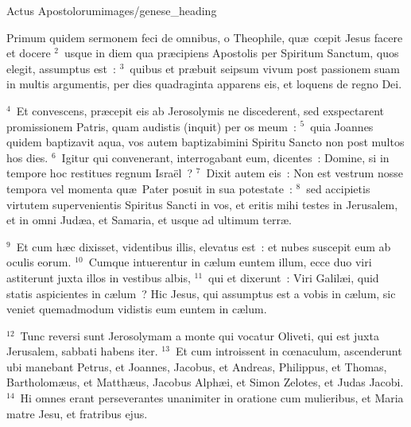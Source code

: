 {Actus Apostolorum}{images/genese_heading}


\lettrine[lines=6,image=true,loversize=0.05,lraise=-0.03]{P}{}rimum quidem sermonem feci de omnibus, o Theophile, qu\ae\ cœpit Jesus facere et docere
${}^{2}$~usque in diem qua pr\ae cipiens Apostolis per Spiritum Sanctum, quos elegit, assumptus est~:
${}^{3}$~quibus et pr\ae buit seipsum vivum post passionem suam in multis argumentis, per dies quadraginta apparens eis, et loquens de regno Dei.


${}^{4}$~Et convescens, pr\ae cepit eis ab Jerosolymis ne discederent, sed exspectarent promissionem Patris, quam audistis (inquit) per os meum~:
${}^{5}$~quia Joannes quidem baptizavit aqua, vos autem baptizabimini Spiritu Sancto non post multos hos dies.
${}^{6}$~Igitur qui convenerant, interrogabant eum, dicentes~: Domine, si in tempore hoc restitues regnum Isra\"el~?
${}^{7}$~Dixit autem eis~: Non est vestrum nosse tempora vel momenta qu\ae\ Pater posuit in sua potestate~:
${}^{8}$~sed accipietis virtutem supervenientis Spiritus Sancti in vos, et eritis mihi testes in Jerusalem, et in omni Jud\ae a, et Samaria, et usque ad ultimum terr\ae .


${}^{9}$~Et cum h\ae c dixisset, videntibus illis, elevatus est~: et nubes suscepit eum ab oculis eorum.
${}^{10}$~Cumque intuerentur in c\ae lum euntem illum, ecce duo viri astiterunt juxta illos in vestibus albis,
${}^{11}$~qui et dixerunt~: Viri Galil\ae i, quid statis aspicientes in c\ae lum~? Hic Jesus, qui assumptus est a vobis in c\ae lum, sic veniet quemadmodum vidistis eum euntem in c\ae lum.


${}^{12}$~Tunc reversi sunt Jerosolymam a monte qui vocatur Oliveti, qui est juxta Jerusalem, sabbati habens iter.
${}^{13}$~Et cum introissent in cœnaculum, ascenderunt ubi manebant Petrus, et Joannes, Jacobus, et Andreas, Philippus, et Thomas, Bartholom\ae us, et Matth\ae us, Jacobus Alph\ae i, et Simon Zelotes, et Judas Jacobi.
${}^{14}$~Hi omnes erant perseverantes unanimiter in oratione cum mulieribus, et Maria matre Jesu, et fratribus ejus.


